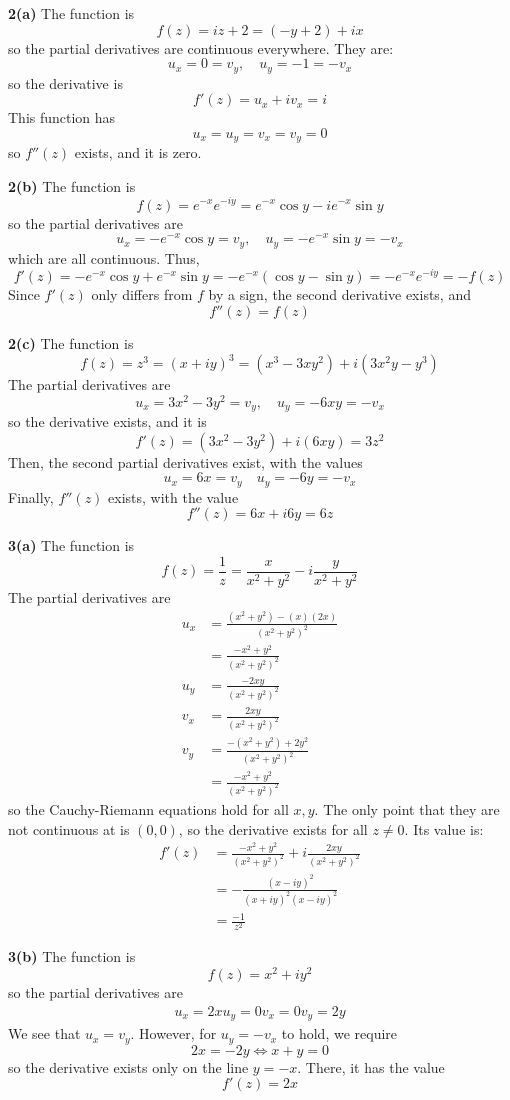 \documentclass{article}
\begin{document}
\textbf{2(a)}
The function is
\[
	f(z) = iz + 2 = (-y + 2) + ix
\]
so the partial derivatives are continuous everywhere. They are:
\[
	u_x = 0 = v_y,	\quad u_y = -1 = -v_x
\]
so the derivative is
\[
	f'(z) = u_x + iv_x = i
\]
This function has
\[
	u_x = u_y = v_x = v_y = 0
\]
so $f''(z)$ exists, and it is zero.

\textbf{2(b)}
The function is
\[
	f(z) = e^{-x}e^{-iy} = e^{-x} \cos y - ie^{-x} \sin y
\]
so the partial derivatives are
\[
	u_x = -e^{-x} \cos y = v_y, \quad
	u_y = -e^{-x} \sin y = -v_x
\]
which are all continuous. Thus,
\[
	f'(z) = -e^{-x} \cos y + e^{-x} \sin y
	= -e^{-x} (\cos y - \sin y)
	= -e^{-x} e^{-iy} = -f(z)
\]
Since $f'(z)$ only differs from $f$ by a sign, the second derivative exists, and
\[
	f''(z) = f(z)
\]

\textbf{2(c)}
The function is
\[
	f(z) = z^3 = (x + iy)^3 = (x^3 - 3xy^2) + i(3x^2y - y^3) 
\]
The partial derivatives are
\[
	u_x = 3x^2 - 3y^2 = v_y,	\quad
	u_y = -6xy = -v_x
\]
so the derivative exists, and it is
\[
	f'(z) = (3x^2 - 3y^2) + i(6xy) = 3z^2
\]
Then, the second partial derivatives exist, with the values
\[
	u_x = 6x = v_y	\quad
	u_y = -6y = -v_x
\]
Finally, $f''(z)$ exists, with the value
\[
	f''(z) = 6x + i6y = 6z
\]


\textbf{3(a)}
The function is
\[
	f(z) = \frac{1}{z} = \frac{x}{x^2 + y^2} - i\frac{y}{x^2 + y^2}
\]
The partial derivatives are
\begin{align*}
	u_x &= \frac{(x^2 + y^2) - (x)(2x)}{(x^2 + y^2)^2} \\
		&= \frac{-x^2 + y^2}{(x^2 + y^2)^2} \\
	u_y &= \frac{-2xy}{(x^2 + y^2)^2} \\
	v_x &= \frac{2xy}{(x^2 + y^2)^2} \\
	v_y &= \frac{-(x^2 + y^2) + 2y^2}{(x^2 + y^2)^2} \\
		&= \frac{-x^2 + y^2}{(x^2 + y^2)^2}
\end{align*}
so the Cauchy-Riemann equations hold for all $x, y$. The only point that they are not continuous at is $(0, 0)$, so the derivative exists for all $z \neq 0$. Its value is:
\begin{align*}
	f'(z) &= \frac{-x^2 + y^2}{(x^2 + y^2)^2} + i\frac{2xy}{(x^2 + y^2)^2} \\
	&= -\frac{(x - iy)^2}{(x + iy)^2(x - iy)^2} \\
	&= \frac{-1}{z^2}
\end{align*}

\textbf{3(b)}
The function is
\[
	f(z) = x^2 + iy^2
\]
so the partial derivatives are
\begin{align*}
	u_x = 2x
	u_y = 0
	v_x = 0
	v_y = 2y
\end{align*}
We see that $u_x = v_y$. However, for $u_y = -v_x$ to hold, we require
\[
	2x = -2y	\iff	x + y = 0
\]
so the derivative exists only on the line $y = -x$. There, it has the value
\[
	f'(z) = 2x
\]
\end{document}
